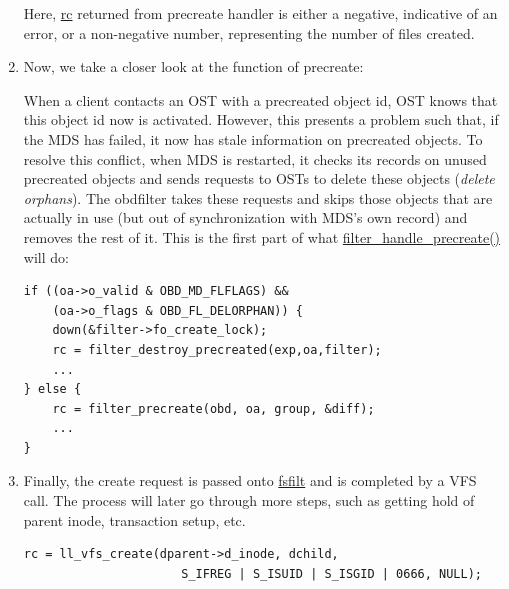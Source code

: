 \begin{enumerate}
Here, \url{rc} returned from precreate handler is either a negative, indicative
of an error, or a non-negative number, representing the number of files created.

\item Now, we take a closer look at the function of precreate: 

When a client contacts an OST with a precreated object id, OST knows that this
object id now is activated. However, this presents a problem such that, if the MDS
has failed, it now has stale information on precreated
objects. To resolve this conflict, when MDS is restarted, it checks its records
on unused precreated objects and sends requests to OSTs to delete these
objects (\textit{delete orphans}). The obdfilter takes these requests and
skips those objects that are actually in use (but out of synchronization with
MDS's own record) and removes the rest of it. This is the first part of what
\url{filter_handle_precreate()} will do:

\begin{Verbatim}
if ((oa->o_valid & OBD_MD_FLFLAGS) && 
    (oa->o_flags & OBD_FL_DELORPHAN)) {
    down(&filter->fo_create_lock);
    rc = filter_destroy_precreated(exp,oa,filter);
    ...
} else {
    rc = filter_precreate(obd, oa, group, &diff);
    ...
}
\end{Verbatim}

\item Finally, the create request is passed onto \url{fsfilt} and is completed by
a VFS call. The process will later go through more steps, such as getting hold
of parent inode, transaction setup, etc.

\begin{Verbatim}
rc = ll_vfs_create(dparent->d_inode, dchild, 
                      S_IFREG | S_ISUID | S_ISGID | 0666, NULL);
\end{Verbatim}

\end{enumerate}



